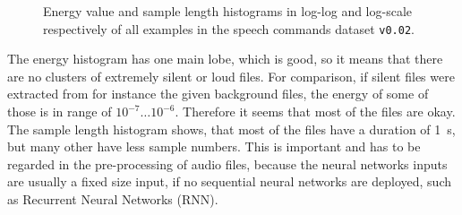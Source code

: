 \begin{figure}[!ht]
  \centering
  \caption{Energy value and sample length histograms in log-log and log-scale respectively of all examples in the speech commands dataset \texttt{v0.02}.}
  \label{fig:exp_dataset_hist}
\end{figure}
\FloatBarrier
\noindent
The energy histogram has one main lobe, which is good, so it means that there are no clusters of extremely silent or loud files.
For comparison, if silent files were extracted from for instance the given background files, the energy of some of those is in range of $10^{-7} \dots 10^{-6}$. Therefore it seems that most of the files are okay.
The sample length histogram shows, that most of the files have a duration of \SI{1}{\second}, but many other have less sample numbers. 
This is important and has to be regarded in the pre-processing of audio files, because the neural networks inputs are usually a fixed size input, if no sequential neural networks are deployed, such as Recurrent Neural Networks (RNN).

